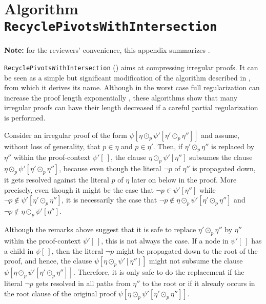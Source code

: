 \section{Algorithm \texttt{RecyclePivotsWithIntersection}}
\label{Section:RPI}

\newcommand{\tRes}{\odot}
\newcommand{\tResFact}{\otimes}
\newcommand{\tResChain}{\ominus}
\newcommand{\AXC}{\AxiomC}
\newcommand{\BIC}{\BinaryInfC}
\newcommand{\RName}[1]{\RightLabel{#1}}
\newcommand{\p}[1]{\hat{#1}}
\newcommand{\ub}[2]{\underbrace{#1}_{#2}}
\newcommand{\tResStar}{\circledast}

\textbf{Note:} for the reviewers' convenience, this appendix summarizes \cite{LURPI}.

\bigskip

\noindent
\texttt{RecyclePivotsWithIntersection} ({\RPI}) \cite{LURPI} aims at compressing irregular proofs. It can be seen as a simple 
but significant modification of the {\RP} algorithm described in 
\cite{RP08}, 
from which it derives its name. 
Although in the worst case full regularization can increase the proof length exponentially 
\cite{Tseitin}, these algorithms show that 
many irregular proofs can have their length decreased if a careful partial regularization is performed. 

Consider an irregular proof of the form $\psi[ \eta \tRes_p \psi'[\eta' \tRes_p \eta''] ]$ and assume, without loss of generality, that $p \in \eta$ and $p \in \eta'$. Then, if $\eta' \tRes_p \eta''$ is replaced by $\eta''$ within the proof-context $\psi'[\ ]$, the clause $\eta \tRes_p \psi'[\eta'']$ subsumes the clause $\eta \tRes_p \psi'[\eta' \tRes_p \eta'']$, because even though the literal $\neg p$ of $\eta''$ is
propagated down, it gets resolved against the literal $p$ of $\eta$ later on below in the proof. More precisely, even though it might be the case that $\neg p \in \psi'[\eta'']$ while $\neg p \notin \psi'[\eta' \tRes_p \eta'']$, it is necessarily the case that $\neg p \notin \eta \tRes_p \psi'[\eta' \tRes_p \eta'']$ and $\neg p \notin \eta \tRes_p \psi'[\eta'']$.

Although the remarks above suggest that it is safe to replace $\eta' \tRes_p
\eta''$ by $\eta''$ within the proof-context $\psi'[\ ]$, this is not always the
case. If a node in $\psi'[\ ]$ has a child in $\psi[\ ]$, then the literal $\neg
p$ might be propagated down to the root of the proof, and hence, the clause
$\psi[ \eta \tRes_p \psi'[ \eta''] ]$ might not subsume the clause $\psi[ \eta
\tRes_p \psi'[\eta' \tRes_p \eta''] ]$. Therefore, it is only safe to do the
replacement if the literal $\neg p$ gets resolved in all paths from $\eta''$ to the root or if it already occurs in the root clause of the original proof $\psi[ \eta \tRes_p \psi'[\eta' \tRes_p \eta''] ]$.


